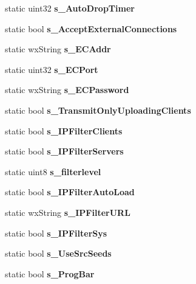 \begin{DoxyCompactItemize}
\item 
static uint32 {\bfseries s\_\-AutoDropTimer}\label{classCPreferences_a2ec2995c0cc3480667fc8aa90762ce57}

\item 
static bool {\bfseries s\_\-AcceptExternalConnections}\label{classCPreferences_ae4ce7a0e8c30c6bb2db67cf04c7d608f}

\item 
static wxString {\bfseries s\_\-ECAddr}\label{classCPreferences_a0588e29953b6cc9747a6524d35bac49f}

\item 
static uint32 {\bfseries s\_\-ECPort}\label{classCPreferences_afda050a4d20ab7a7eab6dd938f39c91c}

\item 
static wxString {\bfseries s\_\-ECPassword}\label{classCPreferences_a5bc6359f62cadb12ba4ce9d2f62c8898}

\item 
static bool {\bfseries s\_\-TransmitOnlyUploadingClients}\label{classCPreferences_abbc5df4e3a43c52ccd2bc48d36a17219}

\item 
static bool {\bfseries s\_\-IPFilterClients}\label{classCPreferences_aef8ac39853f0ec9f42aa1849818b38b7}

\item 
static bool {\bfseries s\_\-IPFilterServers}\label{classCPreferences_adb1f9b5e4d04958509998699e157e2bf}

\item 
static uint8 {\bfseries s\_\-filterlevel}\label{classCPreferences_ab1ab433985e695ca770ddb8f16cbd211}

\item 
static bool {\bfseries s\_\-IPFilterAutoLoad}\label{classCPreferences_a26e11b6bfbbdf59dbc3ce5d14ef75c35}

\item 
static wxString {\bfseries s\_\-IPFilterURL}\label{classCPreferences_a946f75f1691e26a4a20b10e98987713c}

\item 
static bool {\bfseries s\_\-IPFilterSys}\label{classCPreferences_a0f4937a6c305ad0264f051f77ab80f3b}

\item 
static bool {\bfseries s\_\-UseSrcSeeds}\label{classCPreferences_a390b9ae8333098b9021b4fec888d050b}

\item 
static bool {\bfseries s\_\-ProgBar}\label{classCPreferences_abb9c32cc78302ac8e38ca9104e728e3e}


\end{DoxyCompactItemize}
